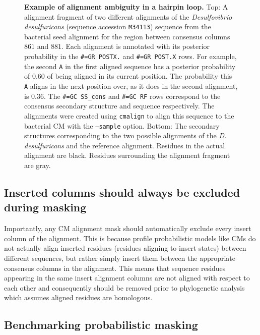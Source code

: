 \begin{figure}
\begin{center}
\caption[Example of alignment ambiguity in a hairpin loop.]{
  \textbf{Example of alignment ambiguity in a hairpin loop.}  Top: A
  alignment fragment of two different alignments of the
  \emph{Desulfovibrio desulfuricans} (sequence accession
  \texttt{M34113}) sequence from the  bacterial seed
  alignment for the region between consensus columns $861$ and $881$.
  Each alignment is annotated with its posterior probability in the
  \texttt{\#=GR POSTX.} and \texttt{\#=GR POST.X} rows.  For example,
  the second \texttt{A} in the first aligned sequence has a posterior
  probability of $0.60$ of being aligned in its current position. The
  probability this \texttt{A} aligns in the next position over, as it
  does in the second alignment, is $0.36$.  The \texttt{\#=GC
    SS\_cons} and \texttt{\#=GC RF} rows correspond to the consensus
  secondary structure and sequence respectively.  The alignments were
  created using \texttt{cmalign} to align this sequence to the
  bacterial CM with the \texttt{--sample} option.  Bottom: The
  secondary structures corresponding to the two possible alignments of
  the \emph{D. desulfuricans} and the reference alignment.  Residues
  in the actual alignment are black. Residues surrounding the
  alignment fragment are gray.}
\end{center}
\label{fig:ambiguity}
\end{figure}

\subsection{Inserted columns should always be excluded during masking}

Importantly, any CM alignment mask should automatically exclude 
every insert column of the alignment. This is because profile
probabilistic models like CMs do not actually align inserted residues
(residues aligning to insert states) between different sequences, but
rather simply insert them between the appropriate consensus columns in
the alignment. This means that sequence residues appearing in the same
insert alignment columns are not aligned with respect to each
other and consequently should be removed prior to phylogenetic
analysis which assumes aligned residues are homologous.

\subsection{Benchmarking probabilistic masking}

